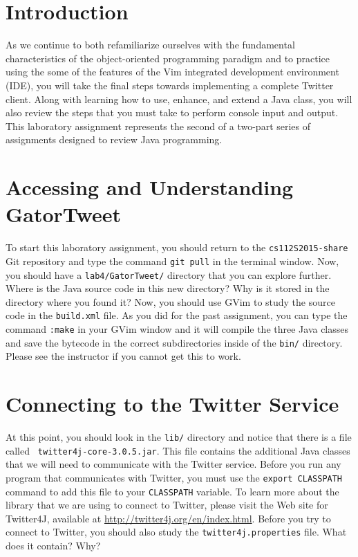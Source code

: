 


\usepackage[compact]{titlesec}



\section*{Introduction}

As we continue to both refamiliarize ourselves with the fundamental characteristics of the object-oriented programming
paradigm and to practice using the some of the features of the Vim integrated development environment (IDE), you will
take the final steps towards implementing a complete Twitter client.  Along with learning how to use, enhance, and
extend a Java class, you will also review the steps that you must take to perform console input and output. This
laboratory assignment represents the second of a two-part series of assignments designed to review Java programming.

\section*{Accessing and Understanding GatorTweet}

To start this laboratory assignment, you should return to the {\tt cs112S2015-share} Git repository and type the command {\tt git
  pull} in the terminal window.  Now, you should have a {\tt lab4/GatorTweet/} directory that you can explore further.  Where is
the Java source code in this new directory? Why is it stored in the directory where you found it? Now, you should use GVim to
study the source code in the {\tt build.xml} file.  As you did for the past assignment, you can type the command {\tt :make} in
your GVim window and it will compile the three Java classes and save the bytecode in the correct subdirectories inside of the
{\tt bin/} directory.  Please see the instructor if you cannot get this to work.

\section*{Connecting to the Twitter Service}

\begin{sloppypar} At this point, you should look in the {\tt lib/} directory and notice that there is a file called {\tt
    twitter4j-core-3.0.5.jar}.  This file contains the additional Java classes that we will need to communicate with the Twitter
  service. Before you run any program that communicates with Twitter, you must use the {\tt export CLASSPATH} command to add this
  file to your {\tt CLASSPATH} variable.  To learn more about the library that we are using to connect to Twitter, please visit
  the Web site for Twitter4J, available at \url{http://twitter4j.org/en/index.html}. Before you try to connect to Twitter,
  you should also study the {\tt twitter4j.properties} file. What does it contain? Why?  \end{sloppypar}

